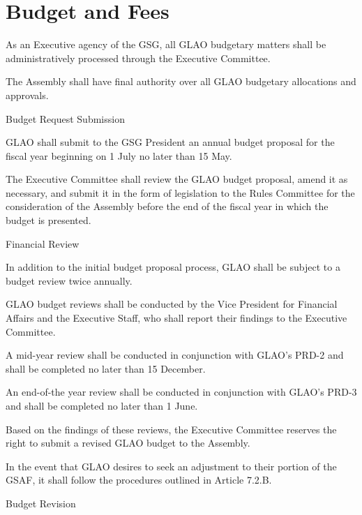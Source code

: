 \section{Budget and Fees}
\begin{bylaws-number}
  \item As an Executive agency of the GSG, all GLAO budgetary matters shall be administratively processed through the Executive Committee.
  \item The Assembly shall have final authority over all GLAO budgetary allocations and approvals.
  \item Budget Request Submission
  \begin{bylaws-number}
    \item GLAO shall submit to the GSG President an annual budget proposal for the fiscal year beginning on 1 July no later than 15 May.
    \item The Executive Committee shall review the GLAO budget proposal, amend it as necessary, and submit it in the form of legislation to the Rules Committee for the consideration of the Assembly before the end of the fiscal year in which the budget is presented.
  \end{bylaws-number}
  \item Financial Review
  \begin{bylaws-number}
    \item In addition to the initial budget proposal process, GLAO shall be subject to a budget review twice annually.
    \item GLAO budget reviews shall be conducted by the Vice President for Financial Affairs and the Executive Staff, who shall report their findings to the Executive Committee.
    \item A mid-year review shall be conducted in conjunction with GLAO’s PRD-2 and shall be completed no later than 15 December.
    \item An end-of-the year review shall be conducted in conjunction with GLAO’s PRD-3 and shall be completed no later than 1 June.
    \item Based on the findings of these reviews, the Executive Committee reserves the right to submit a revised GLAO budget to the Assembly.
  \end{bylaws-number}
  \item In the event that GLAO desires to seek an adjustment to their portion of the GSAF, it shall follow the procedures outlined in Article 7.2.B.
  \item Budget Revision
  \begin{bylaws-number}

\end{bylaws-number}
\end{bylaws-number}
